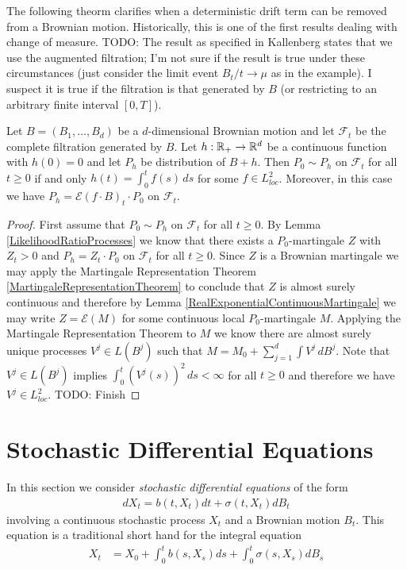 The following theorm clarifies when a deterministic drift term can be removed from a Brownian motion.  Historically, this is one of the first results dealing with change of measure.  TODO: The result as specified in Kallenberg states that we use the augmented filtration; I'm not sure if the result is true under these circumstances (just consider the limit event $B_t/t \to \mu$ as in the example).  I suspect it is true if the filtration is that generated by $B$ (or restricting to an arbitrary finite interval $[0,T]$).
\begin{thm}\label{CameronMartin}Let $B=(B_1, \dotsc, B_d)$ be a $d$-dimensional Brownian motion and let $\mathcal{F}_t$ be the complete filtration generated by $B$. Let $h: \mathbb{R}_+ \to \mathbb{R}^d$ be a continuous function with $h(0) = 0$ and let $P_h$ be distribution of $B + h$.  Then $P_0 \sim P_h$ on $\mathcal{F}_t$ for all $t \geq 0$ if and only $h(t) = \int_0^t f(s) \, ds$ for some $f \in L^2_{loc}$.  Moreover, in this case we have $P_h = \mathcal{E}(f \cdot B)_t \cdot P_0$ on $\mathcal{F}_t$.
\end{thm}
\begin{proof}
First assume that $P_0 \sim P_h$ on $\mathcal{F}_t$ for all $t \geq 0$.  By Lemma \ref{LikelihoodRatioProcesses} we know that there exists a $P_0$-martingale $Z$ with $Z_t > 0$ and $P_h = Z_t \cdot P_0$ on $\mathcal{F}_t$ for all $t \geq 0$.  Since $Z$  is a Brownian martingale we may apply the Martingale Representation Theorem \ref{MartingaleRepresentationTheorem} to conclude that $Z$ is almost surely continuous and therefore by Lemma \ref{RealExponentialContinuousMartingale} we may write $Z = \mathcal{E}(M)$ for some continuous local $P_0$-martingale $M$.  Applying the Martingale Representation Theorem to $M$ we know there are almost surely unique processes $V^j \in L(B^j)$ such that $M = M_0 + \sum_{j=1}^d \int V^j \, dB^j$.  Note that $V^j \in L(B^j)$ implies $\int_0^t (V^j(s))^2 \, ds < \infty$ for all $t \geq 0$ and therefore we have $V^j \in L^2_{loc}$.
TODO: Finish
\end{proof}

\section{Stochastic Differential Equations}

In this section we consider \emph{stochastic differential equations} of the form
\begin{align*}
dX_t = b(t,X_t) dt + \sigma(t,X_t) dB_t
\end{align*}
involving a continuous stochastic process $X_t$ and a Brownian motion $B_t$.   This equation is a traditional short hand for the integral equation
\begin{align}\label{StochasticIntegralEquation}
X_t &= X_0 + \int_0^t b(s, X_s) ds + \int_0^t \sigma(s,X_s) dB_s
\end{align}

